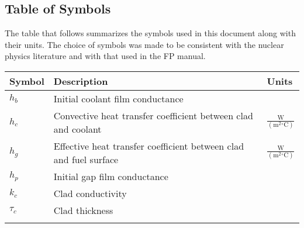 \documentclass[12pt]{article}
\begin{document}
\subsection{Table of Symbols}
\label{Sec:ToS}
The table that follows summarizes the symbols used in this document along with their units. The choice of symbols was made to be consistent with the nuclear physics literature and with that used in the FP manual.
\begin{longtabu}{l X[l] l}
\toprule
Symbol & Description & Units
\\
\midrule
${h_{b}}$ & Initial coolant film conductance & 
\\
${h_{c}}$ & Convective heat transfer coefficient between clad and coolant & $\frac{\text{W}}{(\text{m}^{2}{}^{\circ}\text{C})}$
\\
${h_{g}}$ & Effective heat transfer coefficient between clad and fuel surface & $\frac{\text{W}}{(\text{m}^{2}{}^{\circ}\text{C})}$
\\
${h_{p}}$ & Initial gap film conductance & 
\\
${k_{c}}$ & Clad conductivity & 
\\
${τ_{c}}$ & Clad thickness & 
\\
\bottomrule
\label{Table:ToS}
\end{longtabu}
\end{document}
